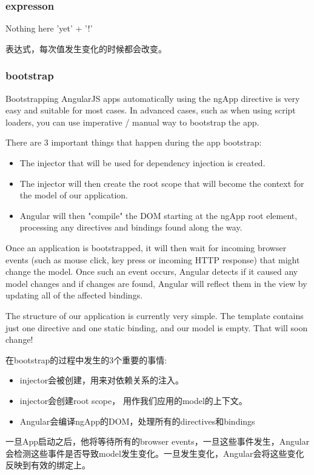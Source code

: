 \subsubsection{expresson}

\begin{HTML5}[ng-app]
Nothing here {{'yet' + '!'}}
\end{HTML5}

表达式，每次值发生变化的时候都会改变。


\subsubsection{bootstrap}

Bootstrapping AngularJS apps automatically using the ngApp directive is very easy and suitable for most cases. In advanced cases, such as when using script loaders, you can use imperative / manual way to bootstrap the app.


There are 3 important things that happen during the app bootstrap:

\begin{itemize}

\item The injector that will be used for dependency injection is created.

\item The injector will then create the root scope that will become the context for the model of our application.

\item Angular will then "compile" the DOM starting at the ngApp root element, processing any directives and bindings found along the way.

\end{itemize}



Once an application is bootstrapped, it will then wait for incoming browser events (such as mouse click, key press or incoming HTTP response) that might change the model. Once such an event occurs, Angular detects if it caused any model changes and if changes are found, Angular will reflect them in the view by updating all of the affected bindings.

The structure of our application is currently very simple. The template contains just one directive and one static binding, and our model is empty. That will soon change!


在bootstrap的过程中发生的3个重要的事情:
\begin{itemize}
\item injector会被创建，用来对依赖关系的注入。
\item injector会创建root scope， 用作我们应用的model的上下文。
\item Angular会编译ngApp的DOM，处理所有的directives和bindings
\end{itemize}

一旦App启动之后，他将等待所有的browser events，一旦这些事件发生，Angular会检测这些事件是否导致model发生变化。一旦发生变化，Angular会将这些变化反映到有效的绑定上。



